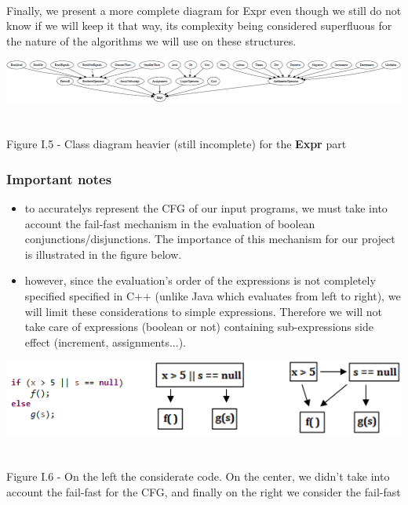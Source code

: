 \documentclass{report}
\begin{document}
\paragraph{}
\hspace{4mm}\textnormal{Finally, we present a more complete diagram for Expr even though we still do not know if we will keep it that way,
its complexity being considered superfluous for the nature of the algorithms we will use on these structures.}

\begin{center}
\includegraphics[scale=0.5]{data/expr2.png}
~\\~\\Figure I.5 - Class diagram heavier (still incomplete) for the \textbf{Expr} part
\end{center}

\subsubsection{Important notes}

\vspace{4mm}
\begin{itemize}
\item to accuratelys represent the CFG of our input programs, we must take into account the fail-fast mechanism in the evaluation of boolean conjunctions/disjunctions.
The importance of this mechanism for our project is illustrated in the figure below.\vspace{1mm}
\item however, since the evaluation's order of the expressions is not completely specified specified in C++ (unlike Java which evaluates from left to right),
we will limit these considerations to simple expressions. Therefore we will not take care of expressions (boolean or not) containing 
sub-expressions side effect (increment, assignments...).\vspace{1mm}
\end{itemize}

\begin{center}
\includegraphics[scale=0.85]{data/fail-fast.png}
~\\~\\Figure I.6 - On the left the considerate code. On the center, we didn't take into account the fail-fast for the CFG, and finally on the right we consider the fail-fast
\end{center}
\end{document}
